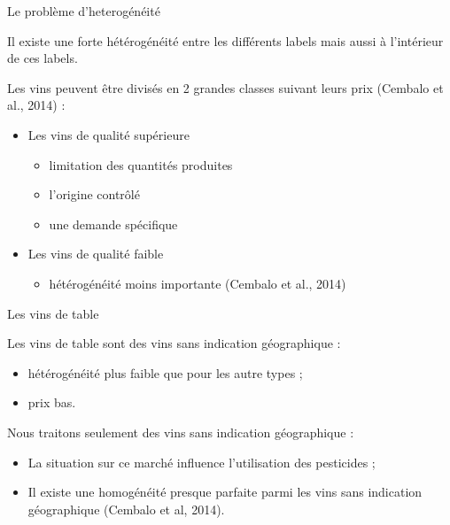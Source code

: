 \documentclass[11pt,ignorenonframetext,]{beamer}
\providecommand{\tightlist}{%
  \setlength{\itemsep}{0pt}\setlength{\parskip}{0pt}}
\begin{document}
\begin{frame}{Le problème d'heterogénéité}
\protect\hypertarget{le-probleme-dheterogeneite}{}

Il existe une forte hétérogénéité entre les différents labels mais aussi
à l'intérieur de ces labels.

Les vins peuvent être divisés en 2 grandes classes suivant leurs prix
(Cembalo et al., 2014) :

\begin{itemize}
\tightlist
\item
  Les vins de qualité supérieure

  \begin{itemize}
  \tightlist
  \item
    limitation des quantités produites
  \item
    l'origine contrôlé
  \item
    une demande spécifique
  \end{itemize}
\item
  Les vins de qualité faible

  \begin{itemize}
  \tightlist
  \item
    hétérogénéité moins importante (Cembalo et al., 2014)
  \end{itemize}
\end{itemize}

\end{frame}

\begin{frame}{Les vins de table}
\protect\hypertarget{les-vins-de-table}{}

Les vins de table sont des vins sans indication géographique :

\begin{itemize}
\tightlist
\item
  hétérogénéité plus faible que pour les autre types ;
\item
  prix bas.
\end{itemize}

Nous traitons seulement des vins sans indication géographique :

\begin{itemize}
\tightlist
\item
  La situation sur ce marché influence l'utilisation des pesticides ;
\item
  Il existe une homogénéité presque parfaite parmi les vins sans
  indication géographique (Cembalo et al, 2014).
\end{itemize}

\end{frame}
\end{document}
